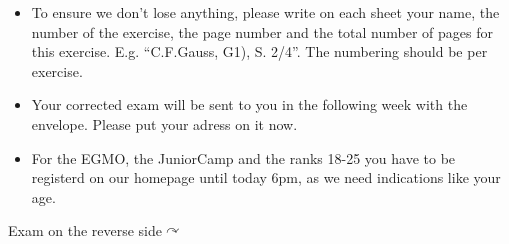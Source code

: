 \documentclass[12pt,a4paper]{article}
\begin{document}
\begin{itemize}
\item To ensure we don't lose anything, please write on each sheet your name, the number of the exercise, the page number and the total number of pages for this exercise. E.g. ``C.F.Gauss, G1), S. 2/4''. The numbering should be per exercise.

\item Your corrected exam will be sent to you in the following week with the envelope. Please put your adress on it now.

\item For the EGMO, the JuniorCamp and the ranks 18-25 you have to be registerd on our homepage until today 6pm, as we need indications like your age.
\end{itemize}

\vfill
\hfill
Exam on the reverse side$\curvearrowright$
\end{document}
